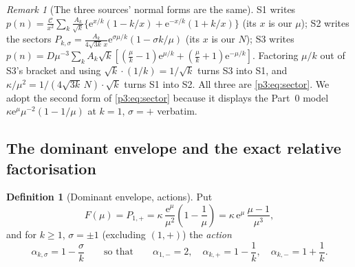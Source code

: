 \documentclass[11pt,a4paper,oneside]{book}
\theoremstyle{plain}
\theoremstyle{definition}
\newtheorem{definition}[theorem]{Definition}
\theoremstyle{remark}
\newtheorem{remark}[theorem]{Remark}
\newcommand{\e}{\mathrm{e}}
\begin{document}
\begin{remark}[The three sources' normal forms are the same]
\label{p3:rem:three-normal-forms}
S1 writes $p(n)=\frac{\mathcal{C}}{x^{2}}\sum_{k}\frac{A_{k}}{\sqrt k}
\{\e^{x/k}(1-k/x)+\e^{-x/k}(1+k/x)\}$ (its $x$ is our $\mu$); S2 writes the sectors
$P_{k,\sigma}=\frac{A_{k}}{4\sqrt{3k}\,x} \e^{\sigma\mu/k}(1-\sigma k/\mu)$ (its $x$ is our $N$);
S3 writes $p(n)=D\mu^{-3}\sum_{k}A_{k}\sqrt k [(\tfrac\mu k-1)\e^{\mu/k}+(\tfrac\mu
k+1)\e^{-\mu/k}]$. Factoring $\mu/k$ out of S3's bracket and using $\sqrt k\cdot(1/k)=1/\sqrt k$
turns S3 into S1, and $\kappa/\mu^{2}=1/(4\sqrt{3k}\,N)\cdot\sqrt k$ turns S1 into S2. All three
are \cref{p3:eq:sector}. We adopt the second form of \cref{p3:eq:sector} because it displays the
Part~0 model $\kappa\e^{\mu}\mu^{-2}(1-1/\mu)$ at $k=1$, $\sigma=+$ verbatim.
\end{remark}

\subsection{The dominant envelope and the exact relative factorisation}

\begin{definition}[Dominant envelope, actions]\label{p3:def:envelope}
Put
\begin{equation}\label{p3:eq:envelope}
 F(\mu)=P_{1,+}=\kappa\,\frac{\e^{\mu}}{\mu^{2}}\left(1-\frac1\mu\right)
 =\kappa\,\e^{\mu}\,\frac{\mu-1}{\mu^{3}},
\end{equation}
and for $k\ge1$, $\sigma=\pm1$ (excluding $(1,+)$) the \emph{action}
\begin{equation}\label{p3:eq:action}
 \alpha_{k,\sigma}=1-\frac{\sigma}{k}
 \qquad\text{so that}\qquad
 \alpha_{1,-}=2,\quad \alpha_{k,+}=1-\frac1k,\quad \alpha_{k,-}=1+\frac1k .
\end{equation}
\end{definition}
\end{document}
